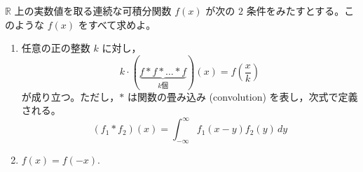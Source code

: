 \documentclass[12pt]{jlreq}
\newcommand{\R}{\mathbb{R}}
\begin{document}
$\R$ 上の実数値を取る連続な可積分関数 $f(x)$ が次の $2$ 条件をみたすとする。このような $f(x)$ をすべて求めよ。
\begin{enumerate}
  \item 任意の正の整数 $k$ に対し，
  \[
    k \cdot (\underbrace{f * f * \dots * f}_{k \text{個}})(x) = f\left(\frac{x}{k}\right)
  \]
  が成り立つ。ただし，$*$ は関数の畳み込み (convolution) を表し，次式で定義される。
  \[
    (f_1 * f_2)(x) = \int_{-\infty}^\infty f_1(x-y)f_2(y) \, dy
  \]
  \item $f(x) = f(-x)$.
\end{enumerate}
\end{document}
